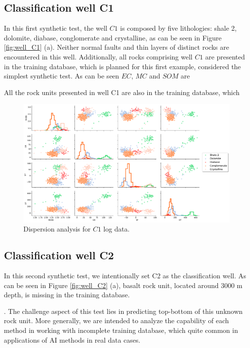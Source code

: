 \documentclass[preprint,12pt]{elsarticle}
\begin{document}
\subsection{Classification well C1}

In this first synthetic test, the well $C1$ is composed by five lithologies: shale 2, dolomite, diabase, conglomerate and crystalline, as can be seen in Figure \ref{fig:well_C1} (a). Neither normal faults and thin layers of distinct rocks are encountered in this well. Additionally, all rocks comprising well $C1$ are presented in the training database, which is planned for this first example, considered the simplest synthetic test. As can be seen  $EC$, $MC$ and $SOM$ are   

All the rock units presented in well C1 are also in the training database, which    
\begin{figure}[!htb]
	\centering
	\includegraphics[scale=0.40]{imagens/C1dispersion_convolved.pdf}
	\caption{Dispersion analysis for $C1$ log data. }
	\label{fig:C1_disp}
\end{figure}





\subsection{Classification well C2}

In this second synthetic test, we intentionally set C2 as the classification well. As can be seen in Figure \ref{fig:well_C2} (a), basalt rock unit, located around $3000$ m depth, is missing in the training database. 

. The challenge aspect of this test lies in predicting top-bottom of this unknown rock unit. More generally, we are intended to analyze the capability of each method in working with incomplete training database, which quite common in applications of AI methods in real data cases.  
\end{document}
